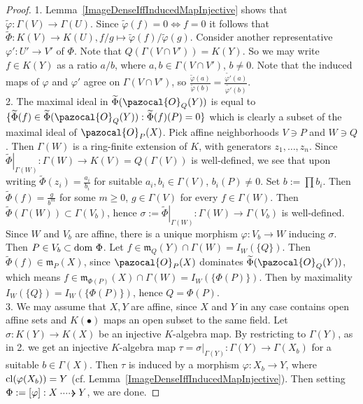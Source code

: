     \begin{proof}
        1. Lemma~\ref{ImageDenseIffInducedMapInjective} shows that $\widetilde{\varphi}:\Gamma(V)\rightarrow\Gamma(U)$. Since $\widetilde{\varphi}(f)=0\iff f=0$ it follows that $\widetilde{\Phi}: K(V) \rightarrow K(U), f/g\mapsto \widetilde{\varphi}(f)/\widetilde{\varphi}(g)$. Consider another representative $\varphi': U'\rightarrow V'$ of $\Phi$. Note that $Q(\Gamma(V\cap V'))=K(Y)$. So we may write $f\in K(Y)$ as a ratio $a/b$, where $a,b\in \Gamma(V\cap V')$, $b\neq 0$. Note that the induced maps of $\varphi$ and $\varphi'$ agree on $\Gamma(V\cap V')$, so $\frac{\widetilde{\varphi}(a)}{\widetilde{\varphi}(b)}=\frac{\widetilde{\varphi'}(a)}{\widetilde{\varphi'}(b)}.$\\
        2. The maximal ideal in $\widetilde{\Phi}(\pazocal{O}_Q(Y))$ is equal to $\{\widetilde{\Phi}(f)\in\widetilde{\Phi}(\pazocal{O}_Q(Y)) : \widetilde{\Phi}(f)(P)=0 \}$ which is clearly a subset of the maximal ideal of $\pazocal{O}_P(X)$. Pick affine neighborhoods $V\ni P$ and $W\ni Q$. Then $\Gamma(W)$ is a ring-finite extension of $K$, with generators $z_1,\dots,z_n$. Since $\left.\widetilde{\Phi}\right|_{\Gamma(W)}: \Gamma(W)\rightarrow K(V)=Q(\Gamma(V))$ is well-defined, we see that upon writing $\widetilde{\Phi}(z_i)=\frac{a_i}{b_i}$ for suitable $a_i,b_i\in \Gamma(V)$, $b_i(P)\neq 0$. Set $b:= \prod b_i$. Then $\widetilde{\Phi}(f)=\frac{g}{b^m}$ for some $m\geq 0$, $g\in \Gamma(V)$ for every $f\in \Gamma(W)$. Then $\widetilde{\Phi}(\Gamma(W))\subset \Gamma(V_b)$, hence  $\sigma:=\left.\widetilde{\Phi}\right|_{\Gamma(W)}: \Gamma(W)\rightarrow \Gamma(V_b)$ is well-defined. Since $W$ and $V_b$ are affine, there is a unique morphism $\varphi: V_b\rightarrow W$ inducing $\sigma$. Then $P\in V_b\subset \mathrm{dom} \ \Phi$. Let $f\in  \mathfrak{m}_Q(Y)\cap \Gamma(W)= I_W(\{Q\})$. Then $\widetilde{\Phi}(f)\in \mathfrak{m}_P(X)$, since $\pazocal{O}_P(X)$ dominates $\widetilde{\Phi}(\pazocal{O}_Q(Y))$, which means $f\in \mathfrak{m}_{\Phi(P)}(X)\cap \Gamma(W)=I_W(\{\Phi(P)\})$. Then by maximality $I_W(\{Q\})=I_W(\{\Phi(P)\})$, hence $Q=\Phi(P)$.\\
        3. We may assume that $X,Y$ are affine, since $X$ and $Y$ in any case contains open affine sets and $K(\bullet)$ maps an open subset to the same field. Let $\sigma: K(Y)\rightarrow K(X)$ be an injective $K$-algebra map. By restricting to $\Gamma(Y)$, as in 2. we get an injective $K$-algebra map $\tau=\left.\sigma\right|_{\Gamma(Y)}: \Gamma(Y)\rightarrow \Gamma(X_b)$ for a suitable $b\in \Gamma(X)$. Then $\tau$ is induced by a morphism $\varphi: X_b\rightarrow Y$, where $\mathrm{cl}(\varphi(X_b))=Y$ (cf. Lemma~\ref{ImageDenseIffInducedMapInjective}). Then setting $\Phi := [\varphi] : X \dottedarrow Y$, we are done.  
    \end{proof}
